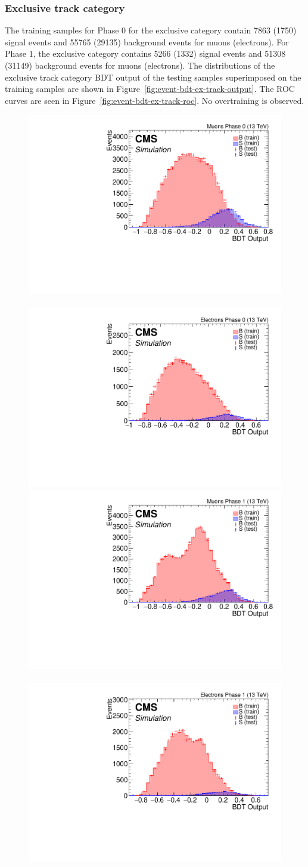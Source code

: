 \clearpage
\subsubsection{Exclusive track category}

The training samples for Phase 0 for the exclusive  category contain 7863 (1750) signal events and 55765 (29135) background events for muons (electrons). For Phase 1, the exclusive category contains 5266 (1332) signal events and 51308 (31149) background events for muons (electrons). The distributions of the exclusive track category BDT output of the testing samples superimposed on the training samples are shown in Figure~\ref{fig:event-bdt-ex-track-output}. The ROC curves are seen in Figure~\ref{fig:event-bdt-ex-track-roc}. No overtraining is observed.

\begin{figure}[!htb]
\centering
\includegraphics[width=0.48\linewidth]{plots/extrack_bdt/overtraining_Event_Ex_Track_Muons_Phase_0.pdf} \,
\includegraphics[width=0.48\linewidth]{plots/extrack_bdt/overtraining_Event_Ex_Track_Electrons_Phase_0.pdf} \\

\includegraphics[width=0.48\linewidth]{plots/extrack_bdt/overtraining_Event_Ex_Track_Muons_Phase_1.pdf} \,
\includegraphics[width=0.48\linewidth]{plots/extrack_bdt/overtraining_Event_Ex_Track_Electrons_Phase_1.pdf} \\


\end{figure}
